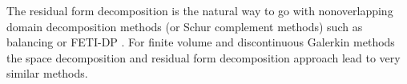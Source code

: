 \documentclass[a4paper,12pt]{article}
\theoremstyle{definition}
\begin{document}
The residual form decomposition is the natural way
to go with nonoverlapping domain decomposition methods (or Schur complement methods)
such as balancing or FETI-DP \cite{TosWid05}. For finite volume and discontinuous Galerkin methods
the space decomposition and residual form decomposition approach lead
to very similar methods.



\end{document}
